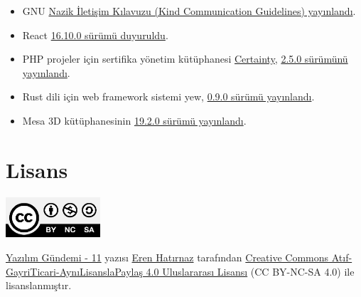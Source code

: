 \documentclass[11pt]{article}
\begin{document}
\begin{itemize}
\item GNU \href{https://lists.gnu.org/archive/html/info-gnu/2018-10/msg00001.html}{Nazik İletişim Kılavuzu (Kind Communication Guidelines) yayınlandı}.
\item React \href{https://github.com/facebook/react/blob/master/CHANGELOG.md\#16100-september-27-2019}{16.10.0 sürümü duyuruldu}.
\item PHP projeler için sertifika yönetim kütüphanesi \href{https://github.com/paragonie/certainty}{Certainty}, \href{https://github.com/paragonie/certainty/releases/tag/v2.5.0}{2.5.0 sürümünü
yayınlandı}.
\item Rust dili için web framework sistemi yew, \href{https://github.com/yewstack/yew/releases/tag/0.9.0}{0.9.0 sürümü yayınlandı}.
\item Mesa 3D kütüphanesinin \href{https://www.mesa3d.org/relnotes/19.2.0.html}{19.2.0 sürümü yayınlandı}.
\end{itemize}
\section{Lisans}
\label{sec:org0b5578b}
\begin{center}
\begin{center}
\includegraphics[height=1.5cm]{../../../img/CC_BY-NC-SA_4.0.png}
\end{center}

\href{yazilim-gundemi-11.pdf}{Yazılım Gündemi - 11} yazısı \href{https://erenhatirnaz.github.io}{Eren Hatırnaz} tarafından \href{http://creativecommons.org/licenses/by-nc-sa/4.0/}{Creative Commons
Atıf-GayriTicari-AynıLisanslaPaylaş 4.0 Uluslararası Lisansı} (CC BY-NC-SA 4.0)
ile lisanslanmıştır.
\end{center}
\end{document}
